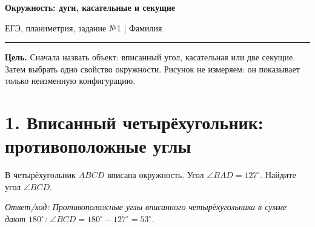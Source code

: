 
\pagestyle{fancy}
\fancyhf{}
\cfoot{\thepage}
\setlength{\headheight}{15pt}
\setlength{\parindent}{0pt}
\newcommand{\ex}{\stepcounter{exercise}\textbf{\theexercise.} }
\newcommand{\answerline}[1]{\rule{#1}{0.4pt}}
\newcommand{\teacheranswer}[1]{\ifteacher\par\smallskip\textit{Ответ/ход: #1}\par\fi}
\newcommand{\rulecard}[2]{\noindent\fbox{\begin{minipage}{.94\linewidth}\textbf{#1} \quad #2\end{minipage}}\par\smallskip}
\newcommand{\picturedtask}[3]{%
\item \begin{minipage}[t]{.64\linewidth}#1\teacheranswer{#3}\end{minipage}\hfill
\begin{minipage}[t]{.31\linewidth}\centering\resizebox{\linewidth}{!}{#2}\end{minipage}\par\medskip}
\newcommand{\taskfigure}[3]{%
\begin{minipage}[t]{.64\linewidth}#1\teacheranswer{#3}\end{minipage}\hfill
\begin{minipage}[t]{.31\linewidth}\centering\resizebox{\linewidth}{!}{#2}\end{minipage}\par\medskip}


\begin{center}
{\Large\textbf{Окружность: дуги, касательные и секущие}}\\[2mm]
{\small ЕГЭ, планиметрия, задание №1 \quad | \quad Фамилия\ \answerline{6cm}}
\end{center}
\ifteacher
\begin{center}\end{center}
\fi

\textbf{Цель.} Сначала назвать объект: вписанный угол, касательная или две
секущие. Затем выбрать одно свойство окружности. Рисунок не измеряем: он
показывает только неизменную конфигурацию.

\section*{1. Вписанный четырёхугольник: противоположные углы}
\taskfigure{В четырёхугольник \(ABCD\) вписана окружность. Угол
\(\angle BAD=127^\circ\). Найдите угол \(\angle BCD\).}
{\figCyclicOpposite{127}}{Противоположные углы вписанного четырёхугольника
в сумме дают \(180^\circ\): \(\angle BCD=180^\circ-127^\circ=53^\circ\).}

